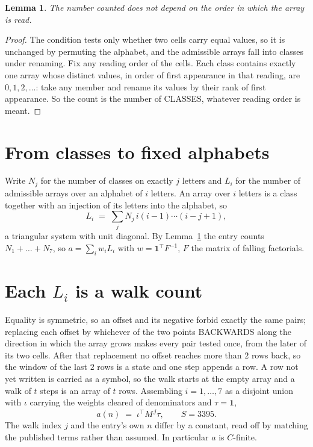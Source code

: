 \documentclass[11pt,a4paper]{article}
\theoremstyle{plain}
\newtheorem{lemma}[theorem]{Lemma}
\theoremstyle{definition}
\begin{document}
\begin{lemma}\label{lem:order}
The number counted does not depend on the order in which the array is read.
\end{lemma}

\begin{proof}
The condition tests only whether two cells carry equal values, so it is unchanged by permuting
the alphabet, and the admissible arrays fall into classes under renaming. Fix any reading order
of the cells. Each class contains exactly one array whose distinct values, in order of first
appearance in that reading, are $0,1,2,\dots$: take any member and rename its values by their
rank of first appearance. So the count is the number of CLASSES, whatever reading order is
meant.
\end{proof}

\section{From classes to fixed alphabets}

Write $N_j$ for the number of classes on exactly $j$ letters and $L_i$ for the number of
admissible arrays over an alphabet of $i$ letters. An array over $i$ letters is a class together
with an injection of its letters into the alphabet, so
\[
L_i\;=\;\sum_j N_j\,i(i-1)\cdots(i-j+1),
\]
a triangular system with unit diagonal. By Lemma~\ref{lem:order} the entry counts
$N_1+\dots+N_{7}$, so $a=\sum_i w_iL_i$ with $w=\mathbf{1}^{\!\top}F^{-1}$, $F$ the
matrix of falling factorials.

\section{Each $L_i$ is a walk count}

Equality is symmetric, so an offset and its negative forbid exactly the same pairs; replacing
each offset by whichever of the two points BACKWARDS along the direction in which the array
grows makes every pair tested once, from the later of its two cells. After that replacement no
offset reaches more than $2$ rows back, so the window of the last $2$
rows is a state and one step appends a row. A row not yet written is
carried as a symbol, so the walk starts at the empty array and a walk of $t$ steps is an array
of $t$ rows. Assembling $i=1,\dots,7$ as a disjoint union with $\iota$ carrying the
weights cleared of denominators and $\tau=\mathbf{1}$,
\[
a(n)\;=\;\iota^{\!\top}M^{\,j}\tau ,\qquad S=3395.
\]
The walk index $j$ and the entry's own $n$ differ by a constant, read off by matching the
published terms rather than assumed. In particular $a$ is $C$-finite.
\end{document}
